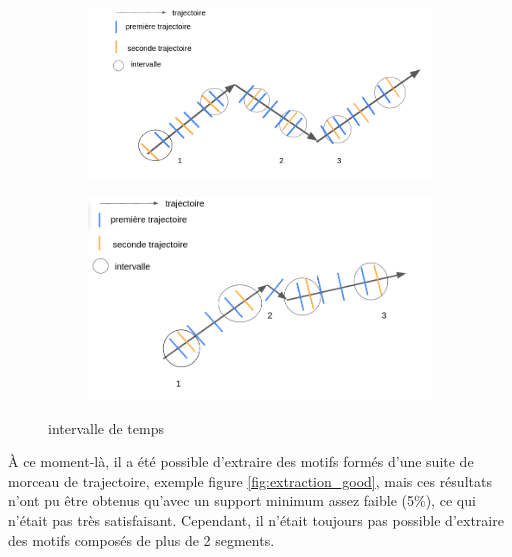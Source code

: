 \begin{figure}[h!]
     \centering
     \begin{subfigure}[b]{0.44\textwidth}
         \centering
         \includegraphics[width=\textwidth]{Images/interval_1.png}         
     \end{subfigure}
     \hfill
     \begin{subfigure}[b]{0.44\textwidth}
         \centering
         \includegraphics[width=\textwidth]{Images/interval_2.png}
     \end{subfigure}
     \caption{intervalle de temps}
     \label{fig:interval}
\end{figure}     

À ce moment-là, il a été possible d'extraire des motifs formés d'une suite de morceau de trajectoire, exemple figure \ref{fig:extraction_good}, mais ces résultats n'ont pu être obtenus qu'avec un support minimum assez faible (5\%), ce qui n'était pas très satisfaisant. Cependant, il n'était toujours pas possible d'extraire des motifs composés de plus de 2 segments.

